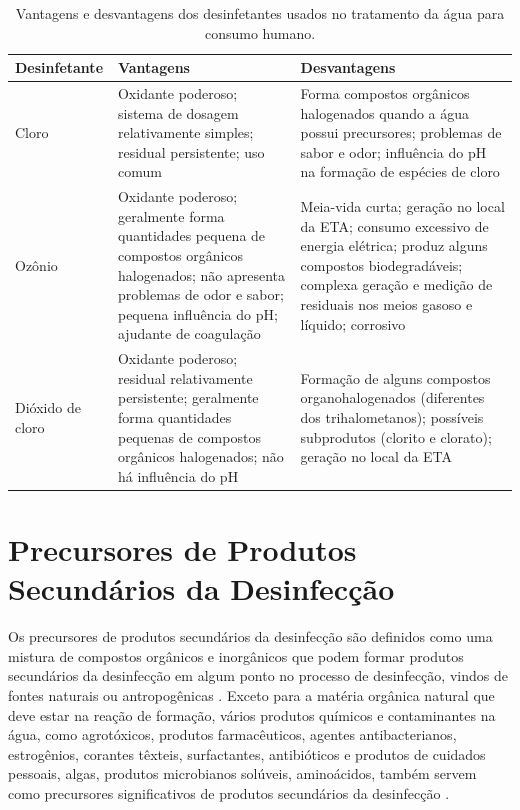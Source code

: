 \begin{table}[!htb]
\begin{center}
\small
\caption{Vantagens e desvantagens dos desinfetantes usados no tratamento da água para consumo humano.} \label{tab:com_esp}
\begin{tabular}{p{2cm}p{6.25cm}p{6.25cm}}
\toprule
\textbf{Desinfetante} & \textbf{Vantagens} & \textbf{Desvantagens} \\
\midrule
Cloro & Oxidante poderoso; sistema de dosagem relativamente simples; residual persistente; uso comum & Forma compostos orgânicos halogenados quando a água possui precursores; problemas de sabor e odor; influência do pH na formação de espécies de cloro\\ \hline
\addlinespace[2pt]
Ozônio & Oxidante poderoso; geralmente forma quantidades pequena de compostos orgânicos halogenados; não apresenta problemas de odor e sabor; pequena influência do pH; ajudante de coagulação & Meia-vida curta; geração no local da ETA; consumo excessivo de energia elétrica; produz alguns compostos biodegradáveis; complexa geração e medição de residuais nos meios gasoso e líquido; corrosivo\\ \hline
\addlinespace[2pt]
Dióxido de cloro & Oxidante poderoso; residual relativamente persistente; geralmente forma quantidades pequenas de compostos orgânicos halogenados; não há influência do pH & Formação de alguns compostos organohalogenados (diferentes dos trihalometanos); possíveis subprodutos (clorito e clorato); geração no local da ETA\\
\bottomrule
\end{tabular}
\end{center}
\end{table}

\section{Precursores de Produtos Secundários da Desinfecção}

Os precursores de produtos secundários da desinfecção são definidos como uma mistura de compostos orgânicos e inorgânicos que podem formar produtos secundários da desinfecção em algum ponto no processo de desinfecção, vindos de fontes naturais ou antropogênicas \cite{chen2010predicting}. Exceto para a matéria orgânica natural que deve estar na reação de formação, vários produtos químicos e contaminantes na água, como agrotóxicos, produtos farmacêuticos, agentes antibacterianos, estrogênios, corantes têxteis, surfactantes, antibióticos e produtos de cuidados pessoais, algas, produtos microbianos solúveis, aminoácidos, também servem como precursores significativos de produtos secundários da desinfecção \cite{lan2018genotoxicity}.

